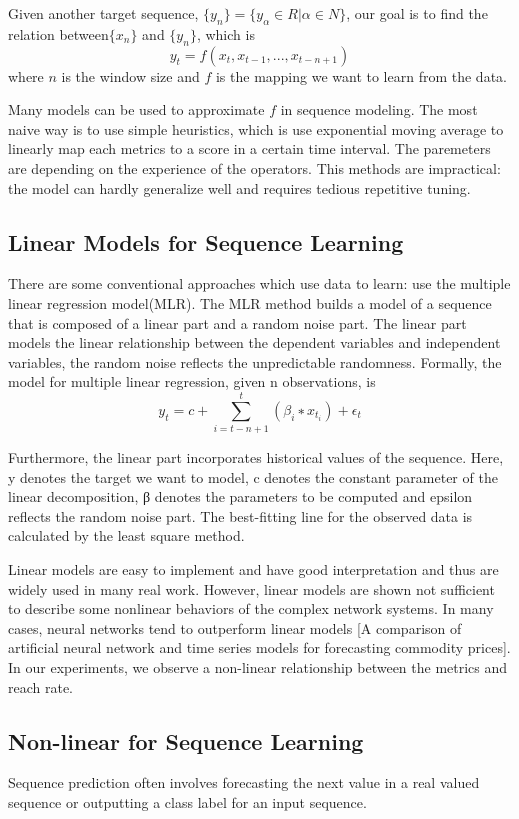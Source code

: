 \documentclass[5p]{elsarticle}
\newcommand{\dabiaolv}{reach rate}
\begin{document}
Given another target sequence, $\{y_n\}=\{y_{\alpha} \in R|\alpha \in N\}$, our goal is to find the relation between$\{x_n\}$ and $\{y_n\}$, which is 
$$y_t=f(x_{t},x_{t-1},...,x_{t-n+1})$$
where $n$ is the window size and $f$ is the mapping we want to learn from the data.

Many models can be used to approximate $f$ in sequence modeling. The most naive way is to use simple heuristics, which is use exponential moving average to linearly map each metrics to a score in a certain time interval. The paremeters are depending on the experience of the operators. This methods are impractical: the model can hardly generalize well and requires tedious repetitive tuning.

\subsection{Linear Models for Sequence Learning}

There are some conventional approaches which use data to learn: use the multiple linear regression model(MLR). The MLR method builds a model of a sequence that is composed of a linear part and a random noise part. The linear part models the linear relationship between the dependent variables and independent variables, the random noise reflects the unpredictable randomness. Formally, the model for multiple linear regression, given n observations, is 
    $$y_t = c+\sum_{i=t-n+1}^{t}(\beta_i ∗ x_{t_i})+\epsilon_t$$

Furthermore, the linear part incorporates historical values of the sequence. Here, y denotes the target we want to model, c denotes the constant parameter of the linear decomposition, β denotes the parameters to be computed and epsilon reflects the random noise part. The best-fitting line for the observed data is calculated by the least square method.


Linear models are easy to implement and have good interpretation and thus are widely used in many real work. However, linear models are shown not sufficient to describe some nonlinear behaviors of the complex network systems. In many cases, neural networks tend to outperform linear models [A comparison of artificial neural network and time series models for forecasting commodity prices]. In our experiments, we observe a non-linear relationship between the metrics and \dabiaolv.


\subsection{Non-linear for Sequence Learning}
Sequence prediction often involves forecasting the next value in a real valued sequence or outputting a class label for an input sequence.
\end{document}
